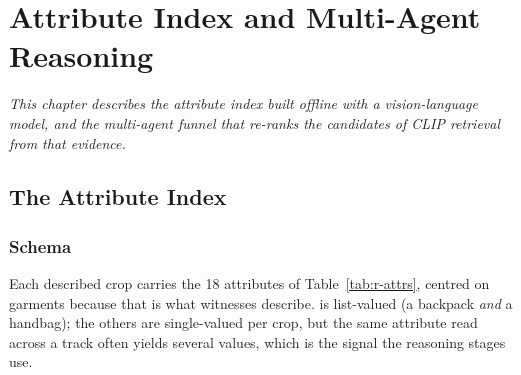 \chapter{Attribute Index and Multi-Agent Reasoning}
\label{chapter:r-reasoning}

\textit{This chapter describes the attribute index built offline with a vision-language model, and the multi-agent funnel that re-ranks the candidates of CLIP retrieval from that evidence.}

\section{The Attribute Index}

\subsection{Schema}
Each described crop carries the 18 attributes of Table~\ref{tab:r-attrs},
centred on garments because that is what witnesses describe.
 is list-valued (a backpack \emph{and} a handbag); the others
are single-valued per crop, but the same attribute read across a track often
yields several values, which is the signal the reasoning stages use.

